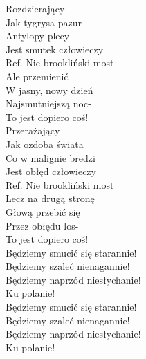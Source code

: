 
\begin{flushleft}
Rozdzierający \tab{}\\
Jak tygrysa pazur \\
Antylopy plecy  \\
Jest smutek człowieczy \\
\vskip 3mm
Ref. Nie brookliński most \\
\hspace{0.9cm}Ale przemienić \\
\hspace{0.9cm}W jasny, nowy dzień \\
\hspace{0.9cm}Najsmutniejszą noc- \\
\hspace{0.9cm}To jest dopiero coś! \\
\vskip 3mm
Przerażający \\
Jak ozdoba świata \\
Co w malignie bredzi \\
Jest obłęd człowieczy \\
\vskip 3mm
Ref. Nie brookliński most\\
\hspace{0.9cm}Lecz na drugą stronę \\
\hspace{0.9cm}Głową przebić się \\
\hspace{0.9cm}Przez obłędu los- \\
\hspace{0.9cm}To jest dopiero coś! \\
\vskip 3mm
\hspace{1.8cm}Będziemy smucić się starannie! \\
\hspace{1.8cm}Będziemy szaleć nienagannie! \\
\hspace{1.8cm}Będziemy naprzód niesłychanie! \\
\hspace{1.8cm}Ku polanie! \tab{} \\
\vskip 3mm
\hspace{1.8cm}Będziemy smucić się starannie! \\
\hspace{1.8cm}Będziemy szaleć nienagannie! \\
\hspace{1.8cm}Będziemy naprzód niesłychanie! \\
\hspace{1.8cm}Ku polanie!  \\
\end{flushleft}
\clearpage

